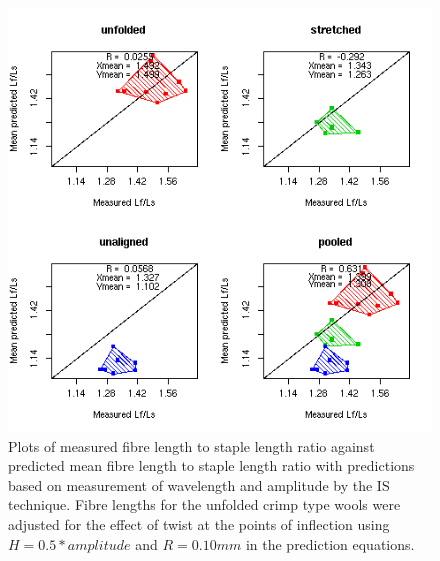 %

\begin{figure}[!h]
  \centering
  \includegraphics[width=1.1\textwidth]{figispredlfr.png}
  \caption{Plots of measured fibre length to staple length ratio against predicted mean fibre length to staple length ratio with predictions based on measurement of wavelength and amplitude by the IS technique. Fibre lengths for the unfolded crimp type wools were adjusted for the effect of twist at the points of inflection using $H = 0.5 * amplitude$ and $R = 0.10 mm$ in the prediction equations.}
  \label{fig:ispredlfr}
\end{figure}

%

